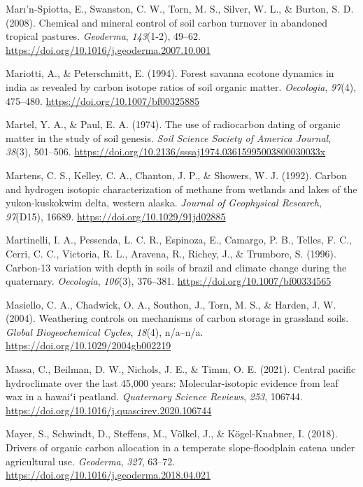 \documentclass[]{article}
\begin{document}
\leavevmode\hypertarget{ref-Mar_n_Spiotta_2008}{}%
Marı'n-Spiotta, E., Swanston, C. W., Torn, M. S., Silver, W. L., \&
Burton, S. D. (2008). Chemical and mineral control of soil carbon
turnover in abandoned tropical pastures. \emph{Geoderma},
\emph{143}(1-2), 49--62.
\url{https://doi.org/10.1016/j.geoderma.2007.10.001}

\leavevmode\hypertarget{ref-Mariotti_1994}{}%
Mariotti, A., \& Peterschmitt, E. (1994). Forest savanna ecotone
dynamics in india as revealed by carbon isotope ratios of soil organic
matter. \emph{Oecologia}, \emph{97}(4), 475--480.
\url{https://doi.org/10.1007/bf00325885}

\leavevmode\hypertarget{ref-Martel_1974}{}%
Martel, Y. A., \& Paul, E. A. (1974). The use of radiocarbon dating of
organic matter in the study of soil genesis. \emph{Soil Science Society
of America Journal}, \emph{38}(3), 501--506.
\url{https://doi.org/10.2136/sssaj1974.03615995003800030033x}

\leavevmode\hypertarget{ref-Martens_1992}{}%
Martens, C. S., Kelley, C. A., Chanton, J. P., \& Showers, W. J. (1992).
Carbon and hydrogen isotopic characterization of methane from wetlands
and lakes of the yukon-kuskokwim delta, western alaska. \emph{Journal of
Geophysical Research}, \emph{97}(D15), 16689.
\url{https://doi.org/10.1029/91jd02885}

\leavevmode\hypertarget{ref-Martinelli_1996}{}%
Martinelli, I. A., Pessenda, L. C. R., Espinoza, E., Camargo, P. B.,
Telles, F. C., Cerri, C. C., Victoria, R. L., Aravena, R., Richey, J.,
\& Trumbore, S. (1996). Carbon-13 variation with depth in soils of
brazil and climate change during the quaternary. \emph{Oecologia},
\emph{106}(3), 376--381. \url{https://doi.org/10.1007/bf00334565}

\leavevmode\hypertarget{ref-Masiello_2004}{}%
Masiello, C. A., Chadwick, O. A., Southon, J., Torn, M. S., \& Harden,
J. W. (2004). Weathering controls on mechanisms of carbon storage in
grassland soils. \emph{Global Biogeochemical Cycles}, \emph{18}(4),
n/a--n/a. \url{https://doi.org/10.1029/2004gb002219}

\leavevmode\hypertarget{ref-Massa_2021}{}%
Massa, C., Beilman, D. W., Nichols, J. E., \& Timm, O. E. (2021).
Central pacific hydroclimate over the last 45,000 years:
Molecular-isotopic evidence from leaf wax in a hawaiʻi peatland.
\emph{Quaternary Science Reviews}, \emph{253}, 106744.
\url{https://doi.org/10.1016/j.quascirev.2020.106744}

\leavevmode\hypertarget{ref-Mayer_2018}{}%
Mayer, S., Schwindt, D., Steffens, M., Völkel, J., \& Kögel-Knabner, I.
(2018). Drivers of organic carbon allocation in a temperate
slope-floodplain catena under agricultural use. \emph{Geoderma},
\emph{327}, 63--72. \url{https://doi.org/10.1016/j.geoderma.2018.04.021}
\end{document}
